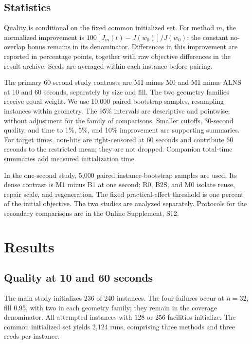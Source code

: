 \documentclass[preprint,12pt,authoryear,nonatbib]{elsarticle}
\begin{document}
\subsection{Statistics}
Quality is conditional on the fixed common initialized set. For method $m$,
the normalized improvement is $100[J_m(t)-J(w_0)]/J(w_0)$; the constant
no-overlap bonus remains in its denominator. Differences in this improvement
are reported in percentage points, together with raw objective differences
in the result archive. Seeds are averaged within each instance before pairing.

The primary 60-second-study contrasts are M1 minus M0 and M1 minus ALNS at
10 and 60 seconds, separately by size and fill. The two geometry families
receive equal weight. We use 10,000 paired bootstrap samples, resampling
instances within geometry. The 95\% intervals are descriptive and pointwise,
without adjustment for the family of comparisons. Smaller cutoffs, 30-second
quality, and time to 1\%, 5\%, and 10\% improvement are supporting summaries.
For target times, non-hits are right-censored at 60 seconds and contribute
60 seconds to the restricted mean; they are not dropped. Companion total-time
summaries add measured initialization time.

In the one-second study, 5,000 paired instance-bootstrap samples are used.
Its dense contrast is M1 minus B1 at one second; R0, B2S, and M0 isolate
reuse, repair scale, and regeneration. The fixed practical-effect threshold
is one percent of the initial objective. The two studies are analyzed separately.
Protocols for the secondary comparisons are in the Online Supplement, S12.

\section{Results}
\label{sec:results}

\subsection{Quality at 10 and 60 seconds}
\label{sec:extendedresults}
The main study initializes 236 of 240 instances. The four failures occur at
$n=32$, fill 0.95, with two in each geometry family; they remain in the
coverage denominator. All attempted instances with 128 or 256 facilities
initialize. The common initialized set yields 2,124 runs, comprising three
methods and three seeds per instance.
\end{document}
